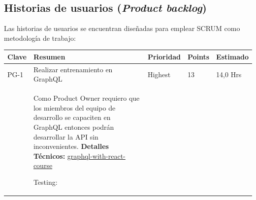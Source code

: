 \documentclass[11pt]{charter}
\begin{document}
\begin{landscape}

\section{Historias de usuarios (\textit{Product backlog})}
\label{sec:backlog}
\vspace*{1px}
Las historias de usuarios se encuentran diseñadas para emplear SCRUM como metodología de trabajo: 

\begin{tabularx}{\linewidth}{@{}|p{1.3cm}|p{17cm}|p{1.7cm}|p{1.5cm}|p{1.7cm}|@{}}
      \hline 
      \rowcolor[HTML]{C0C0C0} 
      \textbf{Clave} & \textbf{Resumen} & \textbf{Prioridad} & \textbf{Points} & \textbf{Estimado}\\ \hline
PG-1     & Realizar entrenamiento en   GraphQL  & Highest            & 13  & 14,0  Hrs         \\
         &  \begin{description}        
                   \item Como Product Owner requiero que los miembros del equipo de desarrollo se capaciten en GraphQL entonces podrán desarrollar la API sin inconvenientes.            
                   \textbf{Detalles Técnicos:} \href{https://www.udemy.com/course/graphql-with-react-course/}{graphql-with-react-course}         
                    \item Testing:
            \end{description}  &  &     & \\
            

\end{tabularx}
\end{landscape}
\end{document}
